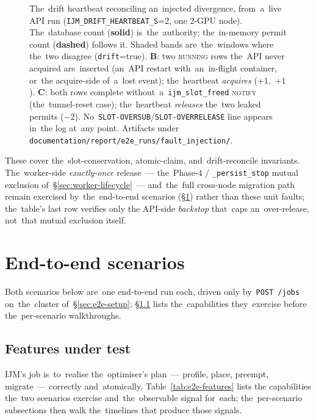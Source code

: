 \begin{figure}[H]\centering
\resizebox{0.9\linewidth}{!}{}
\caption{The~drift heartbeat reconciling an~injected divergence, from~a~live
API run (\texttt{IJM\_DRIFT\_HEARTBEAT\_S}{=}2, one 2-GPU node).  The~database
count (\textbf{solid}) is~the~authority; the~in-memory permit count
(\textbf{dashed}) follows it.  Shaded bands are~the~windows where the~two
disagree (\texttt{drift}{=}true).  \textbf{B}: two \textsc{running} rows the~API
never acquired are~inserted (an~API restart with~an~in-flight container, or~the
acquire-side of~a~lost event); the~heartbeat \emph{acquires} ($+1$,~$+1$).
\textbf{C}: both rows complete without~a~\texttt{ijm\_slot\_freed} \textsc{notify}
(the~tunnel-reset case); the~heartbeat \emph{releases} the~two leaked permits
($-2$).  No~\texttt{SLOT-OVERSUB}/\texttt{SLOT-OVERRELEASE} line appears in~the
log at~any point.  Artifacts under
\texttt{documentation/report/e2e\_runs/fault\_injection/}.}\label{fig:fault-drift}
\end{figure}

These cover the~slot-conservation, atomic-claim, and~drift-reconcile invariants.
The~worker-side \emph{exactly-once} release~--- the~Phase-4 /
\texttt{\_persist\_stop} mutual exclusion of~\S\ref{sec:worker-lifecycle}~---
and~the~full cross-node migration path remain exercised by~the~end-to-end scenarios (\S\ref{sec:e2e-scenarios})
rather than these unit faults; the~table's last row verifies only the
API-side \emph{backstop} that~caps an~over-release, not~that mutual exclusion
itself.

\section{End-to-end scenarios}
\label{sec:e2e-scenarios}

Both scenarios below are~one end-to-end run each, driven only by~\texttt{POST
/jobs} on~the~cluster of~\S\ref{sec:e2e-setup}; \S\ref{sec:e2e-features} lists
the~capabilities they~exercise before the~per-scenario walkthroughs.

\subsection{Features under test}
\label{sec:e2e-features}

IJM's job is~to~realise the~optimiser's plan~--- profile, place, preempt,
migrate~--- correctly and~atomically.  Table~\ref{tab:e2e-features} lists the
capabilities the~two scenarios exercise and~the~observable signal for~each;
the~per-scenario subsections then walk the~timelines that produce those signals.

